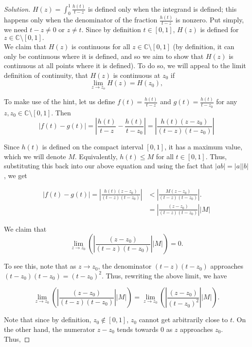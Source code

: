 \documentclass[11pt]{article}
\newcommand{\C}{\mathbb{C}}
\newenvironment{solution}
  {\renewcommand\qedsymbol{$\blacksquare$}\begin{proof}[Solution]}
  {\end{proof}}
\theoremstyle{definition}
\begin{document}
\begin{solution}
$H(z) = \int_0^1 \frac{h(t)}{t-z}$ is defined only when the integrand is defined; this happens only when the denominator of the fraction $\frac{h(t)}{t-z}$ is nonzero. Put simply, we need $t - z \neq 0$ or $z \neq t$. Since by definition $t \in [0, 1]$, $H(z)$ is defined for $z \in \C \setminus [0, 1].$ \\

We claim that $H(z)$ is continuous for all $z \in \C \setminus [0, 1]$ (by definition, it can only be continuous where it is defined, and so we aim to show that $H(z)$ is continuous at all points where it is defined). To do so, we will appeal to the limit definition of continuity, that $H(z)$ is continuous at $z_0$ if \[ \lim\limits_{z \rightarrow z_o} H(z) = H(z_0), \]

To make use of the hint, let us define $f(t) = \frac{h(t)}{t-z}$ and $g(t) = \frac{h(t)}{t-z_0}$ for any $z, z_0 \in \C \setminus [0, 1]$. Then
\[ |f(t) - g(t) |= \left| \frac{h(t)}{t-z} - \frac{h(t)}{t-z_0} \right| = \left| \frac{h(t)(z-z_0)}{(t-z)(t-z_0)}\right|\]

Since $h(t)$ is defined on the compact interval $[0, 1]$, it has a maximum value, which we will denote $M$. Equivalently, $h(t) \leq M$ for all $t \in [0, 1]$. Thus, substituting this back into our above equation and using the fact that $|ab| = |a||b|$, we get

\begin{align*}  |f(t) - g(t)| = \left| \frac{h(t)(z-z_0)}{(t-z)(t-z_0)}\right| &< \left| \frac{M(z-z_0)}{(t-z)(t-z_0)}\right|. \\
&= \left| \frac{(z-z_0)}{(t-z)(t-z_0)}\right| |M|\end{align*}

We claim that \[ \lim\limits_{z \rightarrow z_0} \left(\left| \frac{(z-z_0)}{(t-z)(t-z_0)}\right| |M| \right) = 0. \]

To see this, note that as $z \rightarrow z_0$, the denominator $(t-z)(t-z_0)$ approaches $(t-z_0)(t-z_0) = (t-z_0)^2$. Thus, rewriting the above limit, we have

\[ \lim\limits_{z \rightarrow z_0} \left(\left| \frac{(z-z_0)}{(t-z)(t-z_0)}\right| |M| \right) =  \lim\limits_{z \rightarrow z_0} \left(\left| \frac{(z-z_0)}{(t-z_0)^2}\right| |M| \right) . \]

Note that since by definition, $z_0 \notin [0, 1]$, $z_0$ cannot get arbitrarily close to $t$. On the other hand, the numerator $z-z_0$ tends towards $0$ as $z$ approaches $z_0$. Thus, 


\end{solution}
\end{document}
